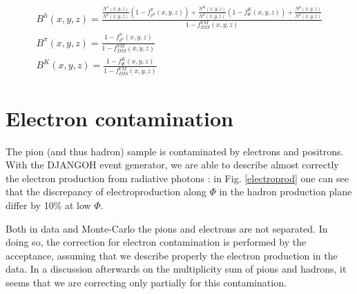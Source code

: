 \begin{equation}
  \begin{split}
  B^h(x,y,z) = \frac{ \frac{N^{\pi}(x,y,z)}{N^h(x,y,z)}\left (1-f^{\pi}_{\rho^0}(x,y,z)\right )
                   + \frac{N^K(x,y,z)}{N^h(x,y,z)}\left (1-f^{K}_{\Phi}(x,y,z)\right ) + \frac{N^p(x,y,z)}{N^h(x,y,z)} }{1-f^{VM}_{DIS}(x,y,z)} \\
  B^{\pi}(x,y,z) = \frac{1-f^{\pi}_{\rho^0}(x,y,z)}{1-f^{VM}_{DIS}(x,y,z)} \\
  B^K(x,y,z) = \frac{1-f^{K}_{\Phi}(x,y,z)}{1-f^{VM}_{DIS}(x,y,z)}
  \end{split}
\end{equation}


\section{Electron contamination}

The pion (and thus hadron) sample is contaminated by electrons and positrons. With the DJANGOH event generator, we are able to describe almost correctly the electron production from radiative photons : in Fig. \ref{electroprod} one can see that the discrepancy of electroproduction along $\Phi$ in the hadron production plane differ by 10\% at low $\Phi$.

Both in data and Monte-Carlo the pions and electrons are not separated. In doing so, the correction for electron contamination is performed by the acceptance, assuming that we describe properly the electron production in the data. In a discussion afterwards on the multiplicity sum of pions and hadrons, it seems that we are correcting only partially for this contamination.
